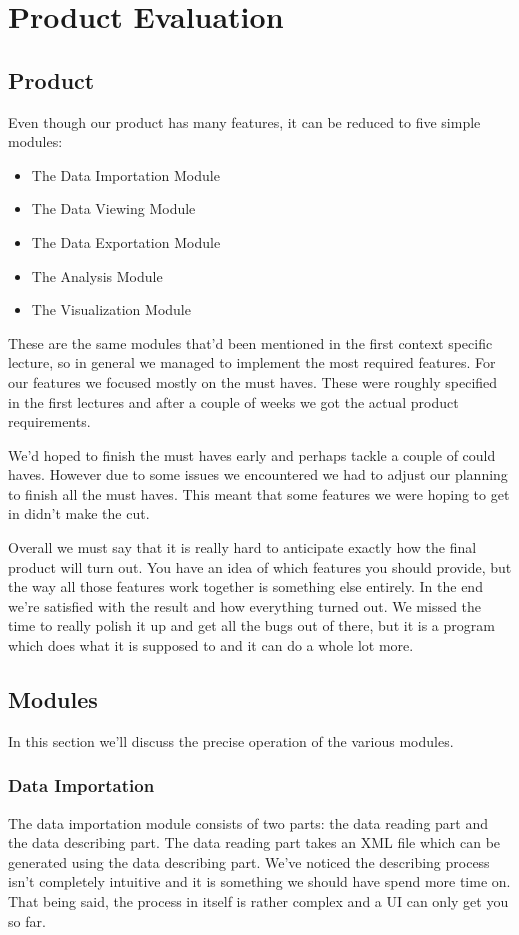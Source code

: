 \chapter{Product Evaluation} %

\section{Product}
Even though our product has many features, it can be reduced to five simple modules:
\begin{itemize}
	\item The Data Importation Module
	\item The Data Viewing Module
	\item The Data Exportation Module
	\item The Analysis Module
	\item The Visualization Module
\end{itemize}
These are the same modules that'd been mentioned in the first context specific lecture, so in general we managed to implement the most required features. For our features we focused mostly on the must haves. These were roughly specified in the first lectures and after a couple of weeks we got the actual product requirements.

We'd hoped to finish the must haves early and perhaps tackle a couple of could haves. However due to some issues we encountered we had to adjust our planning to finish all the must haves. This meant that some features we were hoping to get in didn't make the cut.

Overall we must say that it is really hard to anticipate exactly how the final product will turn out. You have an idea of which features you should provide, but the way all those features work together is something else entirely. In the end we're satisfied with the result and how everything turned out. We missed the time to really polish it up and get all the bugs out of there, but it is a program which does what it is supposed to and it can do a whole lot more.

\section{Modules}
In this section we'll discuss the precise operation of the various modules.

\subsection{Data Importation}
The data importation module consists of two parts: the data reading part and the data describing part. The data reading part takes an XML file which can be generated using the data describing part. We've noticed the describing process isn't completely intuitive and it is something we should have spend more time on. That being said, the process in itself is rather complex and a UI can only get you so far.

